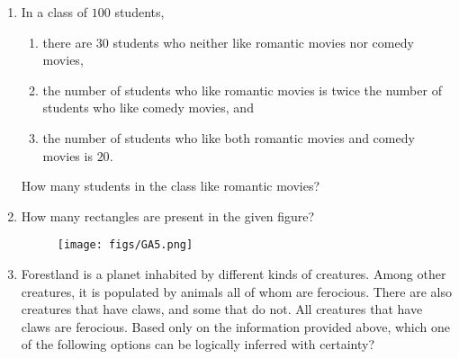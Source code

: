 \documentclass[a4paper, 11pt]{article}
\begin{document}
\begin{enumerate}
    \hfill{}
    
    \item In a class of $100$ students,
    \begin{enumerate}[label=\brak{\roman*}]
        \item there are $30$ students who neither like romantic movies nor comedy movies,
        \item the number of students who like romantic movies is twice the number of students who like comedy movies, and
        \item the number of students who like both romantic movies and comedy movies is $20$.
    \end{enumerate}
    How many students in the class like romantic movies?
    
    \begin{enumerate}
    \end{enumerate}
    
    \hfill{}
    
    \item How many rectangles are present in the given figure?
    \begin{figure}[H]
        \centering
        \texttt{[image: figs/GA5.png]}
        \caption*{}
        \label{fig:q5}
    \end{figure}
    
    \begin{enumerate}
    \end{enumerate}
    
    \hfill{}
    
    \item Forestland is a planet inhabited by different kinds of creatures. Among other creatures, it is populated by animals all of whom are ferocious. There are also creatures that have claws, and some that do not. All creatures that have claws are ferocious.
    Based only on the information provided above, which one of the following options can be logically inferred with certainty?
    

\end{enumerate}
\end{document}
